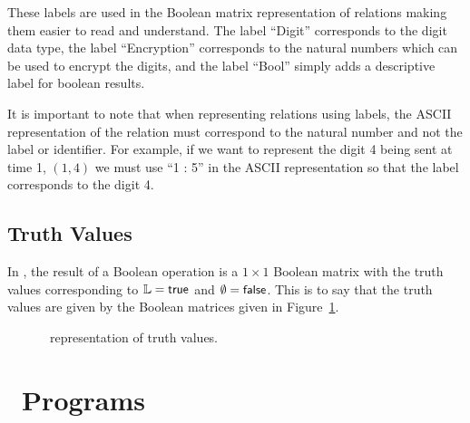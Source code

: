 	These labels are used in the Boolean matrix representation of relations making them easier to read and understand. The label ``Digit'' corresponds to the digit data type, the label ``Encryption'' corresponds to the natural numbers which can be used to encrypt the digits, and the label ``Bool'' simply adds a descriptive label for boolean results. \newline
	
	It is important to note that when representing relations using labels, the ASCII representation of the relation must correspond to the natural number and not the label or identifier. For example, if we want to represent the digit 4 being sent at time 1, \ie $(1,4)$ we must use ``1 : 5'' in the ASCII representation so that the label corresponds to the digit 4.


\subsection{Truth Values}
\label{sub:truth_values}

	In \relview, the result of a Boolean operation is a $1 \times 1$ Boolean matrix with the truth values corresponding to $\mathbb{L} = \textsf{true}$ and $\emptyset = \textsf{false}$. This is to say that the truth values are given by the Boolean matrices given in Figure~\ref{fig:truthvalues}. \newline

	\begin{figure}[ht]
		\centering
		 \hspace{1in}
		\caption{\relview\ representation of truth values.}
		\label{fig:truthvalues}
	\end{figure}



\section{\relview\ Programs}
\label{sec:relview_programs}

